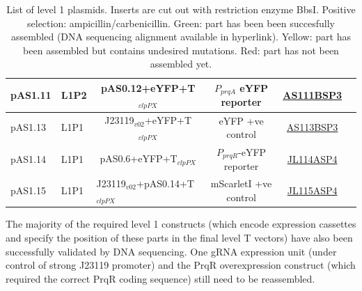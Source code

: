 \begin{table}[H]
\begin{tabular}{|l|l|c|c|c|c|}
pAS1.11 & L1P2 & pAS0.12+eYFP+T$_{clpPX}$ & $P_{prqA}$ eYFP reporter  & \cellcolor[HTML]{32CB00} \href{https://scaralbi.github.io/assets/dna/L1/2020-11-19_B10_ASAS111BSP3-alignment.pdf}{AS111BSP3} \\ \hline
pAS1.13 & L1P1 & J23119$_{v02}$+eYFP+T$_{clpPX}$ & eYFP +ve control  & \cellcolor[HTML]{32CB00} \href{https://scaralbi.github.io/assets/dna/L1/2020-11-19_F10_ASAS113BSP3-alignment.pdf}{AS113BSP3} \\ \hline
pAS1.14 & L1P1 & pAS0.6+eYFP+T$_{clpPX}$ & $P_{prqR}$-eYFP reporter & \cellcolor[HTML]{32CB00} \href{https://scaralbi.github.io/assets/dna/L1/2020-12-01_E06_ASJL114ASP4-alignment.pdf}{JL114ASP4} \\ \hline
pAS1.15 & L1P1 & \multicolumn{1}{l|}{J23119$_{v02}$+pAS0.14+T$_{clpPX}$} & mScarletI +ve control & \cellcolor[HTML]{32CB00} \href{https://scaralbi.github.io/assets/dna/L1/2020-12-15_F07_JLJL115ASP4-alignment.pdf}{JL115ASP4} \\ \hline
\end{tabular}
\caption{List of level 1 plasmids. Inserts are cut out with restriction enzyme BbsI. Positive selection: ampicillin/carbenicillin. Green: part has been been succesfully assembled (DNA sequencing alignment available in hyperlink). Yellow: part has been assembled but contains undesired mutations. Red: part has not been assembled yet.}
\label{table:level1}
\end{table}

The majority of the required level 1 constructs (which encode expression cassettes and specify the position of these parts in the final level T vectors) have also been successfully validated by DNA sequencing. One gRNA expression unit (under control of strong J23119 promoter) and the PrqR overexpression construct (which required the correct PrqR coding sequence) still need to be reassembled.

